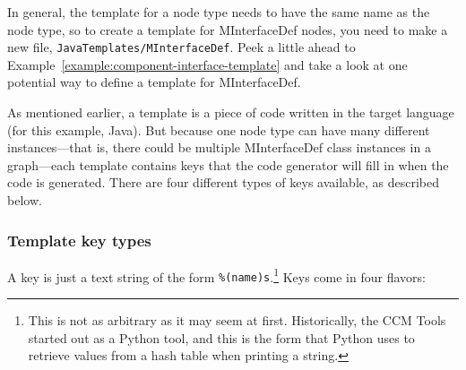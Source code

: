 In general, the template for a node type needs to have the same name as the node
type, so to create a template for MInterfaceDef nodes, you need to make a new
file, {\tt JavaTemplates/MInterfaceDef}. Peek a little ahead to
Example~\ref{example:component-interface-template} and take a look at one
potential way to define a template for MInterfaceDef.

As mentioned earlier, a template is a piece of code written in the target
language (for this example, Java). But because one node type can have many
different instances---that is, there could be multiple MInterfaceDef class
instances in a graph---each template contains keys that the code generator will
fill in when the code is generated. There are four different types of keys
available, as described below.

\subsubsection{Template key types}
\label{subsubsection:component-key-types}

A key is just a text string of the form {\tt \%(name)s}.\footnote{This is not as
arbitrary as it may seem at first. Historically, the CCM Tools started out as a
Python tool, and this is the form that Python uses to retrieve values from a
hash table when printing a string.} Keys come in four flavors:

